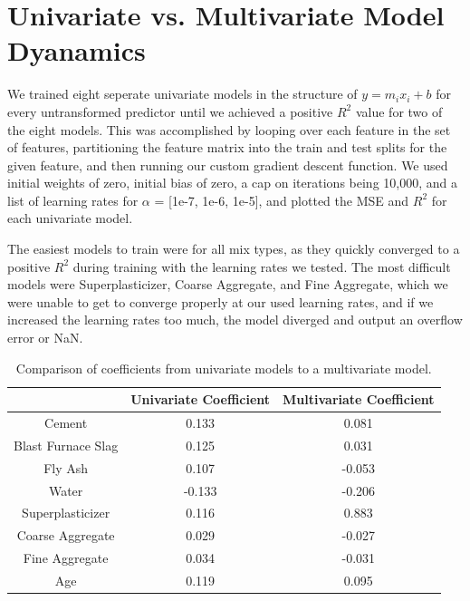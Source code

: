 \documentclass[12pt,letterpaper]{article}
\begin{document}
\newpage

\section{Univariate vs. Multivariate Model Dyanamics}


We trained eight seperate univariate models in the structure of $y = m_{i}x_{i} + b$ for every untransformed predictor until we achieved a positive $R^2$ value for two of the eight models. This was accomplished by looping over each feature in the set of features, partitioning the feature matrix into the train and test splits for the given feature, and then running our custom gradient descent function. We used initial weights of zero, initial bias of zero, a cap on iterations being 10,000, and a list of learning rates for $\alpha$ = [1e-7, 1e-6, 1e-5], and plotted the MSE and $R^2$ for each univariate model.

The easiest models to train were for all mix types, as they quickly converged to a positive $R^2$ during training with the learning rates we tested. The most difficult models were Superplasticizer, Coarse Aggregate, and Fine Aggregate, which we were unable to get to converge properly at our used learning rates, and if we increased the learning rates too much, the model diverged and output an overflow error or NaN.

\begin{table}[h]
    \centering
    \begin{tabular}{ccc}
        \toprule
        & \textbf{Univariate Coefficient} & \textbf{Multivariate Coefficient} \\
        \midrule
        Cement & 0.133 & 0.081 \\
        Blast Furnace Slag & 0.125 & 0.031 \\
        Fly Ash & 0.107  & -0.053 \\
        Water & -0.133 & -0.206 \\
        Superplasticizer & 0.116 & 0.883 \\
        Coarse Aggregate & 0.029 & -0.027 \\
        Fine Aggregate & 0.034 & -0.031 \\
        Age & 0.119 & 0.095 \\
        \bottomrule
    \end{tabular}
    \caption{Comparison of coefficients from univariate models to a multivariate model.}\label{tab:coeff}
\end{table}
\end{document}
